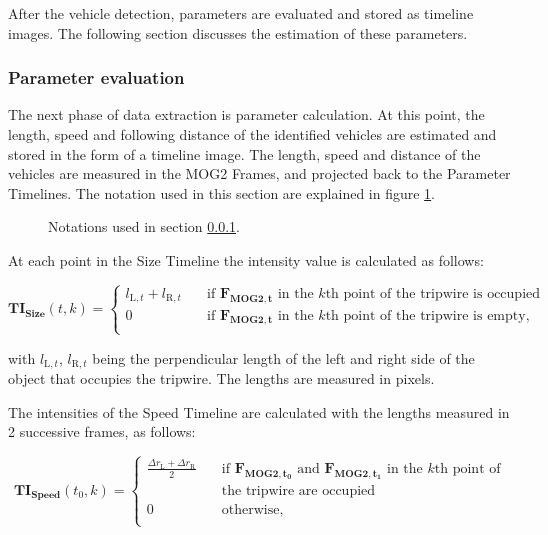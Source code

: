 After the vehicle detection, parameters are evaluated and stored as timeline images.
The following section discusses the estimation of these parameters.

\subsubsection{Parameter evaluation}\label{chap:parameter_evaluation}
The next phase of data extraction is parameter calculation.
At this point, the length, speed and following distance of the identified vehicles are estimated and stored in the form of a timeline image.
The length, speed and distance of the vehicles are measured in the MOG2 Frames, and projected back to the Parameter Timelines.
The notation used in this section are explained in figure \ref{fig:parameter_notations}.

\begin{figure}[!h]
	\centering
	
	\caption[The visualzation of the notations of parameter calculation]{Notations used in section \ref{chap:parameter_evaluation}. \label{fig:parameter_notations}}
\end{figure}

At each point in the Size Timeline the intensity value is calculated as follows:

\begin{displaymath}
 	\boldsymbol{TI_{\text{Size}}}(t,k) = 
	\begin{cases}
	l_{\text{L},t} + l_{\text{R},t}        & \quad \text{if } \boldsymbol{F_{\text{MOG2},t}} \text{ in the } k\text{th} \text{ point of the tripwire is occupied}\\
  	0		& \quad \text{if } \boldsymbol{F_{\text{MOG2},t}} \text{ in the } k\text{th} \text{ point of the tripwire is empty,}\\
	\end{cases}
\end{displaymath}

with $l_{\text{L},t}$, $l_{\text{R},t}$ being the perpendicular length of the left and right side of the object that occupies the tripwire.
The lengths are measured in pixels.

The intensities of the Speed Timeline are calculated with the lengths measured in 2 successive frames, as follows:

\begin{displaymath}
\boldsymbol{TI_{\text{Speed}}}(t_0,k) = 
\begin{cases}
\frac{\Delta r_{\text{L}} + \Delta r_{\text{R}}}{2}      & \quad \text{if } \boldsymbol{F_{\text{MOG2},t_0}} \text{ and } \boldsymbol{F_{\text{MOG2},t_1}} \text{ in the } k\text{th} \text{ point of} \\ & \quad \text{the tripwire are occupied}\\
0		& \quad \text{otherwise,}\\
\end{cases}
\end{displaymath}
 
